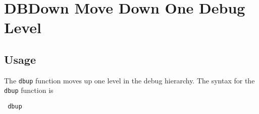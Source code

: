 \section{DBDown Move Down One Debug Level}

\subsection{Usage}

The \verb|dbup| function moves up one level in the debug
hierarchy.  The syntax for the \verb|dbup| function is
\begin{verbatim}
 dbup
\end{verbatim}
